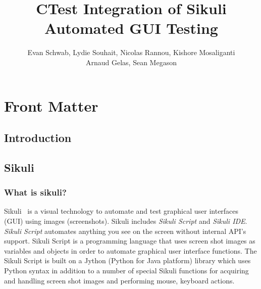 \documentclass{InsightArticle}
\title{CTest Integration of Sikuli Automated GUI Testing}
\author{Evan Schwab, Lydie Souhait, Nicolas Rannou, Kishore Mosaliganti\\
Arnaud Gelas, Sean Megason}
\newcommand{\IJhandlerIDnumber}{3196}
\begin{document}
\IJhandlefooter{\IJhandlerIDnumber}


\ifpdf
\else
\fi

\maketitle

\ifhtml
\chapter*{Front Matter\label{front}}
\fi

\begin{abstract}
\noindent 
\end{abstract}

\IJhandlenote{\IJhandlerIDnumber}

\tableofcontents
\section{Introduction}

\section{Sikuli}

\subsection{What is sikuli?}

Sikuli~\cite{Sikuli:Documentation,Sikuli:Website,Yeh:2009:Sikuli} is a visual
technology to automate and test graphical user interfaces (GUI) using images
(screenshots). Sikuli includes \emph{Sikuli Script} and \emph{Sikuli IDE}.\\

\emph{Sikuli Script} automates anything you see on the screen without internal
API's support. Sikuli Script is a programming language that uses screen shot
images as variables and objects in order to automate graphical user interface
functions. The Sikuli Script is built on a Jython (Python for Java platform)
library which uses Python syntax in addition to a number of special Sikuli
functions for acquiring and handling screen shot images and performing mouse,
keyboard actions.\\
\end{document}
